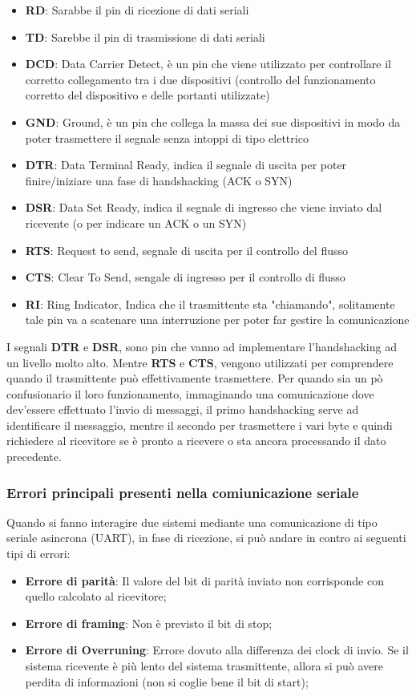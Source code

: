 \begin{itemize}
    \item \textbf{RD}: Sarabbe il pin di ricezione di dati seriali
    \item \textbf{TD}: Sarebbe il pin di trasmissione di dati seriali
    \item \textbf{DCD}: Data Carrier Detect, è un pin che viene utilizzato per controllare il corretto collegamento tra i due dispositivi (controllo del funzionamento corretto del dispositivo e delle portanti utilizzate)
    \item \textbf{GND}: Ground, è un pin che collega la massa dei sue dispositivi in modo da poter trasmettere il segnale senza intoppi di tipo elettrico
    \item \textbf{DTR}: Data Terminal Ready, indica il segnale di uscita per poter finire/iniziare una fase di handshacking (ACK o SYN)
    \item \textbf{DSR}: Data Set Ready, indica il segnale di ingresso che viene inviato dal ricevente (o per indicare un ACK o un SYN)
    \item \textbf{RTS}: Request to send, segnale di uscita per il controllo del flusso
    \item \textbf{CTS}: Clear To Send, sengale di ingresso per il controllo di flusso
    \item \textbf{RI}: Ring Indicator, Indica che il trasmittente sta "chiamando", solitamente tale pin va a scatenare una interruzione per poter far gestire la comunicazione
\end{itemize}
I segnali \textbf{DTR} e \textbf{DSR}, sono pin che vanno ad implementare l'handshacking ad un livello molto alto. Mentre \textbf{RTS} e \textbf{CTS}, vengono utilizzati per comprendere quando il trasmittente può effettivamente trasmettere. Per quando sia un pò confusionario il loro funzionamento, immaginando una comunicazione dove dev'essere effettuato l'invio di messaggi, il primo handshacking serve ad identificare il messaggio, mentre il secondo per trasmettere i vari byte e quindi richiedere al ricevitore se è pronto a ricevere o sta ancora processando il dato precedente.

\subsubsection{Errori principali presenti nella comiunicazione seriale}
Quando si fanno interagire due sistemi mediante una comunicazione di tipo seriale asincrona (UART), in fase di ricezione, si può andare in contro ai seguenti tipi di errori:
\begin{itemize}
    \item \textbf{Errore di parità}: Il valore del bit di parità inviato non corrisponde con quello calcolato al ricevitore;
    \item \textbf{Errore di framing}: Non è previsto il bit di stop;
    \item \textbf{Errore di Overruning}: Errore dovuto alla differenza dei clock di invio. Se il sistema ricevente è più lento del sistema trasmittente, allora si può avere perdita di informazioni (non si coglie bene il bit di start);
\end{itemize}

